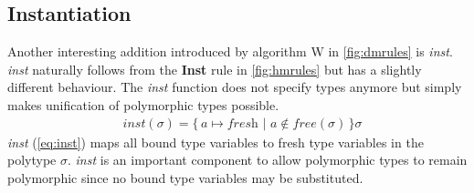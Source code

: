 \subsection{Instantiation}
Another interesting addition introduced by algorithm W in \autoref{fig:dmrules} is \textit{inst}.
\textit{inst} naturally follows from the \textbf{Inst} rule in \autoref{fig:hmrules} but has a slightly different behaviour.
The \textit{inst} function does not specify types anymore but simply makes unification of polymorphic types possible.
\begin{align}
    &\textit{inst}(\sigma) = \{ \, a \mapsto \textit{fresh} \,\,|\,\, a \notin \textit{free}(\sigma) \, \}\sigma
    \label{eq:inst}
\end{align}
\textit{inst} (\autoref{eq:inst}) maps all bound type variables to fresh type variables in the polytype $\sigma$.
\textit{inst} is an important component to allow polymorphic types to remain polymorphic since no bound type variables may be substituted.
